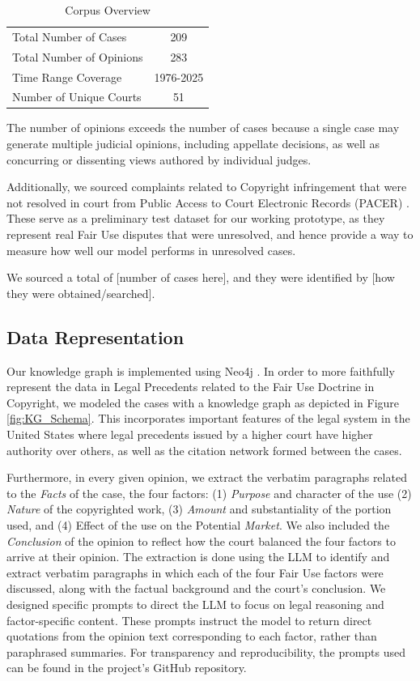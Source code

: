\begin{table}[h!]
  \centering
  \caption{Corpus Overview}
  \begin{tabular}{lc}
    \toprule
    Total Number of Cases & 209 \\
    Total Number of Opinions & 283 \\
    Time Range Coverage & 1976-2025\\
    Number of Unique Courts & 51 \\
    \bottomrule
  \end{tabular}
\end{table}

The number of opinions exceeds the number of cases because a single case may generate multiple judicial opinions, including appellate decisions, as well as concurring or dissenting views authored by individual judges.

Additionally, we sourced complaints related to Copyright infringement that were not resolved in court from Public Access to Court Electronic Records (PACER) \cite{26_PACER}. These serve as a preliminary test dataset for our working prototype, as they represent real Fair Use disputes that were unresolved, and hence provide a way to measure how well our model performs in unresolved cases.

We sourced a total of [number of cases here], and they were identified by [how they were obtained/searched].

\subsection{Data Representation}
\label{sec: data_representation_KG}

Our knowledge graph is implemented using Neo4j \cite{27_neo4j}. In order to more faithfully represent the data in Legal Precedents related to the Fair Use Doctrine in Copyright, we modeled the cases with a knowledge graph as depicted in Figure \ref{fig:KG_Schema}. This incorporates important features of the legal system in the United States where legal precedents issued by a higher court have higher authority over others, as well as the citation network formed between the cases.

Furthermore, in every given opinion, we extract the verbatim paragraphs related to the \textit{Facts} of the case, the four factors: (1) \textit{Purpose} and character of the use (2) \textit{Nature} of the copyrighted work, (3) \textit{Amount} and substantiality of the portion used, and (4) Effect of the use on the Potential \textit{Market}. We also included the \textit{Conclusion} of the opinion to reflect how the court balanced the four factors to arrive at their opinion. The extraction is done using the LLM to identify and extract verbatim paragraphs in which each of the four Fair Use factors were discussed, along with the factual background and the court's conclusion. We designed specific prompts to direct the LLM to focus on legal reasoning and factor-specific content. These prompts instruct the model to return direct quotations from the opinion text corresponding to each factor, rather than paraphrased summaries. For transparency and reproducibility, the prompts used can be found in the project’s GitHub repository. 

